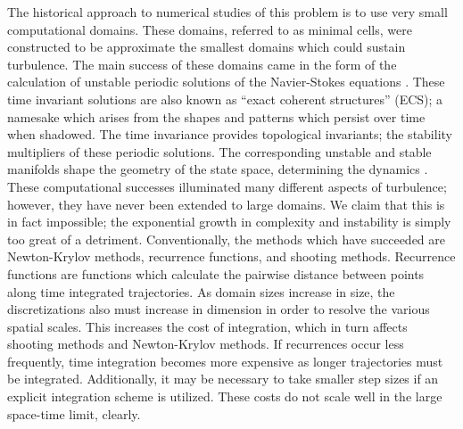The historical approach to numerical studies of this problem is to use very small computational domains.
These domains, referred to as minimal cells, were constructed to be approximate the smallest domains which
could sustain turbulence. The main success of these domains came in the  form of 
the calculation of unstable periodic solutions of the Navier-Stokes equations .
These time invariant solutions are also known as ``exact coherent structures'' (ECS);
a namesake which arises from the shapes and patterns which persist over time when shadowed. The
time invariance provides topological invariants; the stability multipliers of these periodic solutions.
The corresponding unstable and stable manifolds shape the geometry of the state space, determining
the dynamics  . These computational successes illuminated many different aspects of turbulence; however,
they have never been extended to large domains. We claim
that this is in fact impossible; the exponential growth in complexity and instability is simply
too great of a detriment. Conventionally, the methods which have succeeded are Newton-Krylov methods,
recurrence functions, and {\spt} shooting methods. Recurrence functions are functions
which calculate the pairwise distance between points along time integrated trajectories. As
{\spt} domain sizes increase in size, the discretizations also must increase in dimension in
order to resolve the various spatial scales. This increases the cost of integration, which
in turn affects shooting methods and Newton-Krylov methods. If recurrences
occur less frequently, time integration becomes more expensive as longer trajectories must
be integrated. Additionally, it may be necessary to take smaller step sizes if an explicit
integration scheme is utilized. These costs do not scale well in the large space-time limit, clearly.


